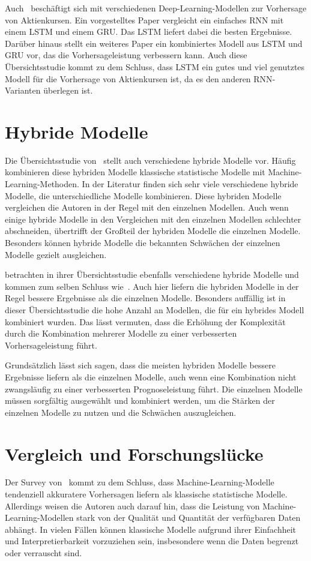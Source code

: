 Auch~\textcite{shah2019stock} beschäftigt sich mit verschiedenen Deep-Learning-Modellen zur Vorhersage von Aktienkursen. Ein vorgestelltes Paper vergleicht ein einfaches \ac{RNN} mit einem \ac{LSTM} und einem \ac{GRU}. Das \ac{LSTM} liefert dabei die besten Ergebnisse. Darüber hinaus stellt ein weiteres Paper ein kombiniertes Modell aus \ac{LSTM} und \ac{GRU} vor, das die Vorhersageleistung verbessern kann. Auch diese Übersichtsstudie kommt zu dem Schluss, dass \ac{LSTM} ein gutes und viel genutztes Modell für die Vorhersage von Aktienkursen ist, da es den anderen \ac{RNN}-Varianten überlegen ist.
\section{Hybride Modelle}\label{sec:hybride_modelle}
Die Übersichtsstudie von~\textcite{rundo2019machine} stellt auch verschiedene hybride Modelle vor. Häufig kombinieren diese hybriden Modelle klassische statistische Modelle mit Machine-Learning-Methoden. In der Literatur finden sich sehr viele verschiedene hybride Modelle, die unterschiedliche Modelle kombinieren. Diese hybriden Modelle vergleichen die Autoren in der Regel mit den einzelnen Modellen. Auch wenn einige hybride Modelle in den Vergleichen mit den einzelnen Modellen schlechter abschneiden, übertrifft der Großteil der hybriden Modelle die einzelnen Modelle. Besonders können hybride Modelle die bekannten Schwächen der einzelnen Modelle gezielt ausgleichen.

\textcite{shah2019stock} betrachten in ihrer Übersichtsstudie ebenfalls verschiedene hybride Modelle und kommen zum selben Schluss wie~\textcite{rundo2019machine}. Auch hier liefern die hybriden Modelle in der Regel bessere Ergebnisse als die einzelnen Modelle. Besonders auffällig ist in dieser Übersichtsstudie die hohe Anzahl an Modellen, die für ein hybrides Modell kombiniert wurden. Das lässt vermuten, dass die Erhöhung der Komplexität durch die Kombination mehrerer Modelle zu einer verbesserten Vorhersageleistung führt.

Grundsätzlich lässt sich sagen, dass die meisten hybriden Modelle bessere Ergebnisse liefern als die einzelnen Modelle, auch wenn eine Kombination nicht zwangsläufig zu einer verbesserten Prognoseleistung führt. Die einzelnen Modelle müssen sorgfältig ausgewählt und kombiniert werden, um die Stärken der einzelnen Modelle zu nutzen und die Schwächen auszugleichen.

\section{Vergleich und Forschungslücke}\label{sec:vergleich_und_forschungsluecke}
Der Survey von~\textcite{rundo2019machine} kommt zu dem Schluss, dass Machine-Learning-Modelle tendenziell akkuratere Vorhersagen liefern als klassische statistische Modelle.
Allerdings weisen die Autoren auch darauf hin, dass die Leistung von Machine-Learning-Modellen stark von der Qualität und Quantität der verfügbaren Daten abhängt. In vielen Fällen können klassische Modelle aufgrund ihrer Einfachheit und Interpretierbarkeit vorzuziehen sein, insbesondere wenn die Daten begrenzt oder verrauscht sind.

